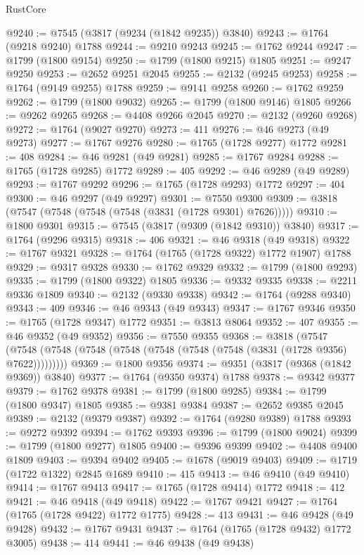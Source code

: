 \begin{lexlean}{RustCore}
\begin{coremodule}
@9240 := @7545 (@3817 (@9234 (@1842 @9235)) @3840)
@9243 := @1764 (@9218 @9240) @1788
@9244 := @9210 @9243
@9245 := @1762 @9244
@9247 := @1799 (@1800 @9154)
@9250 := @1799 (@1800 @9215) @1805
@9251 := @9247 @9250
@9253 := @2652 @9251 @2045
@9255 := @2132 (@9245 @9253)
@9258 := @1764 (@9149 @9255) @1788
@9259 := @9141 @9258
@9260 := @1762 @9259
@9262 := @1799 (@1800 @9032)
@9265 := @1799 (@1800 @9146) @1805
@9266 := @9262 @9265
@9268 := @4408 @9266 @2045
@9270 := @2132 (@9260 @9268)
@9272 := @1764 (@9027 @9270)
@9273 := 411
@9276 := @46 @9273 (@49 @9273)
@9277 := @1767 @9276
@9280 := @1765 (@1728 @9277) @1772
@9281 := 408
@9284 := @46 @9281 (@49 @9281)
@9285 := @1767 @9284
@9288 := @1765 (@1728 @9285) @1772
@9289 := 405
@9292 := @46 @9289 (@49 @9289)
@9293 := @1767 @9292
@9296 := @1765 (@1728 @9293) @1772
@9297 := 404
@9300 := @46 @9297 (@49 @9297)
@9301 := @7550 @9300
@9309 := @3818 (@7547 (@7548 (@7548 (@7548 (@3831 (@1728 @9301) @7626)))))
@9310 := @1800 @9301
@9315 := @7545 (@3817 (@9309 (@1842 @9310)) @3840)
@9317 := @1764 (@9296 @9315)
@9318 := 406
@9321 := @46 @9318 (@49 @9318)
@9322 := @1767 @9321
@9328 := @1764 (@1765 (@1728 @9322) @1772 @1907) @1788
@9329 := @9317 @9328
@9330 := @1762 @9329
@9332 := @1799 (@1800 @9293)
@9335 := @1799 (@1800 @9322) @1805
@9336 := @9332 @9335
@9338 := @2211 @9336 @1809
@9340 := @2132 (@9330 @9338)
@9342 := @1764 (@9288 @9340)
@9343 := 409
@9346 := @46 @9343 (@49 @9343)
@9347 := @1767 @9346
@9350 := @1765 (@1728 @9347) @1772
@9351 := @3813 @8064
@9352 := 407
@9355 := @46 @9352 (@49 @9352)
@9356 := @7550 @9355
@9368 := @3818
    (@7547 (@7548 (@7548 (@7548 (@7548 (@7548 (@7548 (@7548 (@3831 (@1728 @9356) @7622)))))))))
@9369 := @1800 @9356
@9374 := @9351 (@3817 (@9368 (@1842 @9369)) @3840)
@9377 := @1764 (@9350 @9374) @1788
@9378 := @9342 @9377
@9379 := @1762 @9378
@9381 := @1799 (@1800 @9285)
@9384 := @1799 (@1800 @9347) @1805
@9385 := @9381 @9384
@9387 := @2652 @9385 @2045
@9389 := @2132 (@9379 @9387)
@9392 := @1764 (@9280 @9389) @1788
@9393 := @9272 @9392
@9394 := @1762 @9393
@9396 := @1799 (@1800 @9024)
@9399 := @1799 (@1800 @9277) @1805
@9400 := @9396 @9399
@9402 := @4408 @9400 @1809
@9403 := @9394 @9402
@9405 := @1678 (@9019 @9403)
@9409 := @1719 (@1722 @1322) @2845 @1689
@9410 := 415
@9413 := @46 @9410 (@49 @9410)
@9414 := @1767 @9413
@9417 := @1765 (@1728 @9414) @1772
@9418 := 412
@9421 := @46 @9418 (@49 @9418)
@9422 := @1767 @9421
@9427 := @1764 (@1765 (@1728 @9422) @1772 @1775)
@9428 := 413
@9431 := @46 @9428 (@49 @9428)
@9432 := @1767 @9431
@9437 := @1764 (@1765 (@1728 @9432) @1772 @3005)
@9438 := 414
@9441 := @46 @9438 (@49 @9438)

\end{coremodule}
\end{lexlean}
